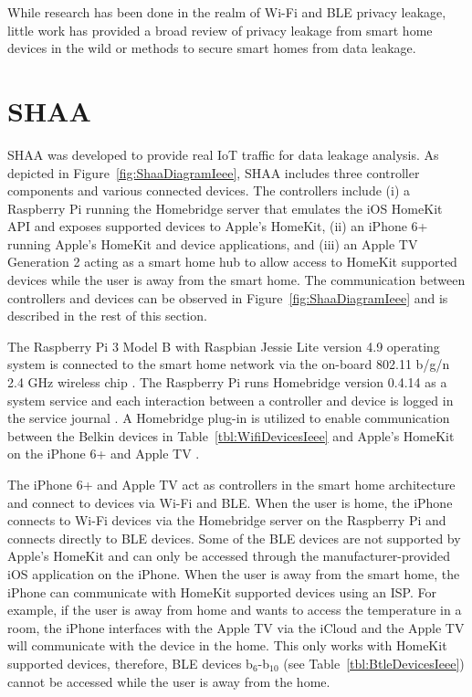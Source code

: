 \documentclass[journal]{./IEEEtran/IEEEtran}
\begin{document}
While research has been done in the realm of Wi-Fi and \ac{BLE} privacy leakage, little work has provided a broad review of privacy leakage from smart home devices in the wild or methods to secure smart homes from data leakage.

\section{\acf{SHAA}}\label{smartHome}
\ac{SHAA} was developed to provide real \ac{IoT} traffic for data leakage analysis. As depicted in Figure~\ref{fig:ShaaDiagramIeee}, \ac{SHAA} includes three controller components and various connected devices. The controllers include (i) a Raspberry Pi running the Homebridge server that emulates the iOS HomeKit \ac{API} and exposes supported devices to Apple's HomeKit, (ii) an iPhone 6+ running Apple's HomeKit and device applications, and (iii) an Apple TV Generation 2 acting as a smart home hub to allow access to HomeKit supported devices while the user is away from the smart home. The communication between controllers and devices can be observed in Figure~\ref{fig:ShaaDiagramIeee} and is described in the rest of this section.

The Raspberry Pi 3 Model B with Raspbian Jessie Lite version 4.9 operating system is connected to the smart home network via the on-board 802.11 b/g/n 2.4 GHz wireless chip \cite{rasbperry}. The Raspberry Pi runs Homebridge version 0.4.14 as a system service and each interaction between a controller and device is logged in the service journal \cite{homebridge}. A Homebridge plug-in is utilized to enable communication between the Belkin devices in Table~\ref{tbl:WifiDevicesIeee} and Apple's HomeKit on the iPhone 6+ and Apple TV \cite{wemo}.

The iPhone 6+ and Apple TV act as controllers in the smart home architecture and connect to devices via Wi-Fi and \ac{BLE}. When the user is home, the iPhone connects to Wi-Fi devices via the Homebridge server on the Raspberry Pi and connects directly to \ac{BLE} devices. Some of the \ac{BLE} devices are not supported by Apple's HomeKit and can only be accessed through the manufacturer-provided iOS application on the iPhone. When the user is away from the smart home, the iPhone can communicate with HomeKit supported devices using an \ac{ISP}. For example, if the user is away from home and wants to access the temperature in a room, the iPhone interfaces with the Apple TV via the iCloud and the Apple TV will communicate with the device in the home. This only works with HomeKit supported devices, therefore, \ac{BLE} devices b$ _6 $-b$ _{10} $ (see Table~\ref{tbl:BtleDevicesIeee}) cannot be accessed while the user is away from the home. 
\end{document}
